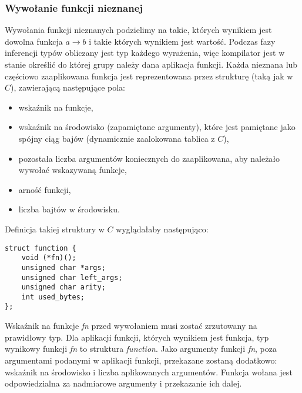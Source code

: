 \documentclass[declaration,shortabstract]{iithesis}
\begin{document}
\subsubsection{Wywołanie funkcji nieznanej}

Wywołania funkcji nieznanych podzielimy na takie, których wynikiem jest dowolna
funkcja $ a \rightarrow b $ i takie których wynikiem jest wartość. Podczas
fazy inferencji typów obliczany jest typ każdego wyrażenia, więc kompilator
jest w stanie określić do której grupy należy dana aplikacja funkcji. Każda 
nieznana lub częściowo zaaplikowana funkcja jest reprezentowana przez strukturę 
(taką jak w $C$), 
zawierającą następujące pola:

\begin{itemize}
  \item wskaźnik na funkcje,
  \item wskaźnik na środowisko (zapamiętane argumenty), które jest pamiętane 
  jako spójny ciąg bajów (dynamicznie zaalokowana tablica z $C$),
  \item pozostała liczba argumentów koniecznych do zaaplikowana, aby należało 
  wywołać wskazywaną funkcje,
  \item arność funkcji,
  \item liczba bajtów w środowisku.
\end{itemize}

Definicja takiej struktury w $C$ wyglądałaby następująco:

\begin{lstlisting}[frame=single, caption=Rozwinięta funkcja w OCamlu.]
struct function {
    void (*fn)();
    unsigned char *args;
    unsigned char left_args;
    unsigned char arity;
    int used_bytes;   
};
\end{lstlisting}

Wskaźnik na funkcje \textit{fn} przed wywołaniem musi zostać zrzutowany na 
prawidłowy typ. Dla aplikacji funkcji, których wynikiem jest funkcja, typ 
wynikowy funkcji \textit{fn} to struktura \textit{function}. Jako argumenty 
funkcji \textit{fn}, poza argumentami podanymi w aplikacji funkcji, przekazane 
zostaną dodatkowo: wskaźnik na środowisko i liczba aplikowanych argumentów.
Funkcja wołana jest odpowiedzialna za nadmiarowe argumenty i przekazanie ich 
dalej.
\end{document}
